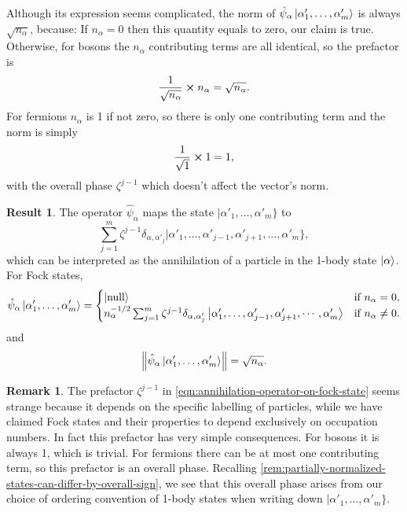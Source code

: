\documentclass{article}
\theoremstyle{definition}
\newtheorem{res}[mot]{Result}
\newtheorem{rem}[mot]{Remark}
\numberwithin{equation}{section}
\begin{document}
Although its expression seems complicated, 
the norm of 
$\hat{\psi}_{\alpha}\ket{\alpha'_{1}, \ldots ,\alpha'_{m}}$ 
is always $\sqrt{n_{\alpha}}$, because:
If $n_{\alpha}=0$ then this quantity equals to zero, 
our claim is true. Otherwise, for bosons 
the $n_{\alpha}$ contributing terms are all identical, 
so the prefactor is 
\[
    \frac{1}{\sqrt{n_{\alpha}}}
    \cross 
    n_{\alpha}
    =
    \sqrt{n_{\alpha}}.
\]
For fermions $n_{\alpha}$ is 1 if not zero, 
so there is only one contributing term and the norm 
is simply 
\[
    \frac{1}{\sqrt{1}}\cross 1=1,
\]
with the overall phase $\zeta^{j-1}$ 
which doesn't affect the vector's norm.


\begin{graybox}

\begin{res}
    The operator $\hat{\psi}_{\alpha}$
    maps the state $|\alpha'_{1}, \ldots ,\alpha'_{m}\}$ to
    \[
        \sum_{j=1}^{m}
        \zeta^{j-1}
    \delta_{\alpha,\alpha'_{j}}
    |\alpha'_{1}, \ldots ,\alpha'_{j-1},
    \alpha'_{j+1}, \ldots ,\alpha'_{m}\},
    \]
    which can be interpreted as 
    the annihilation of a particle 
    in the 1-body state $\ket{\alpha}$. 
    For Fock states,
    \begin{equation}
    \hat{\psi}_{\alpha}
    \ket{\alpha'_{1}, \ldots ,\alpha'_{m}}
    =
    \begin{cases}
        \ket{\text{null}} & \text{if  } n_{\alpha}=0,\\
        n_{\alpha}^{-1 /2}
        \sum_{j=1}^{m}
    \zeta^{j-1}
    \delta_{\alpha,\alpha'_{j}}
    \ket{
        \alpha'_{1}, \ldots ,
        \alpha'_{j-1},\alpha'_{j+1},
        \cdots ,\alpha'_{m}
    }
    & \text{if  } n_{\alpha}\neq 0.
    \end{cases}
    \label{eqn:annihilation-operator-on-fock-state}
    \end{equation}
    and 
    \begin{equation}
        \norm{
            \hat{\psi}_{\alpha}
            \ket{\alpha'_{1}, \ldots ,\alpha'_{m}}
        }
        =
        \sqrt{n_{\alpha}}.
    \end{equation}
\end{res}    

\end{graybox}

\begin{rem}
    The prefactor $\zeta^{j-1}$ in 
    \cref{eqn:annihilation-operator-on-fock-state} 
    seems strange because 
    it depends on the specific labelling of particles, 
    while we have claimed Fock states and their 
    properties to 
    depend exclusively on occupation numbers. 
    In fact this prefactor has very simple 
    consequences. 
    For bosons it is always 1, which is trivial. 
    For fermions there can be at most 
    one contributing term, 
    so this prefactor is an overall phase. 
    Recalling \cref{rem:partially-normalized-states-can-differ-by-overall-sign}, 
    we see that this overall phase arises from our 
    choice of ordering convention of 1-body states 
    when writing down 
    $|\alpha'_{1}, \ldots ,\alpha'_{m}\}$.
\end{rem}
\end{document}
